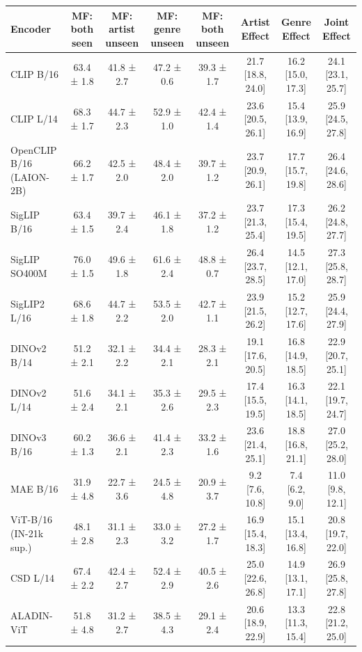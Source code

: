 \begin{tabular}{lccccccc}
\toprule
Encoder & MF: both seen & MF: artist unseen & MF: genre unseen & MF: both unseen & Artist Effect & Genre Effect & Joint Effect \\
\midrule
CLIP B/16 & 63.4 ± 1.8 & 41.8 ± 2.7 & 47.2 ± 0.6 & 39.3 ± 1.7 & 21.7 [18.8, 24.0] & 16.2 [15.0, 17.3] & 24.1 [23.1, 25.7] \\
CLIP L/14 & 68.3 ± 1.7 & 44.7 ± 2.3 & 52.9 ± 1.0 & 42.4 ± 1.4 & 23.6 [20.5, 26.1] & 15.4 [13.9, 16.9] & 25.9 [24.5, 27.8] \\
OpenCLIP B/16 (LAION-2B) & 66.2 ± 1.7 & 42.5 ± 2.0 & 48.4 ± 2.0 & 39.7 ± 1.2 & 23.7 [20.9, 26.1] & 17.7 [15.7, 19.8] & 26.4 [24.6, 28.6] \\
SigLIP B/16 & 63.4 ± 1.5 & 39.7 ± 2.4 & 46.1 ± 1.8 & 37.2 ± 1.2 & 23.7 [21.3, 25.4] & 17.3 [15.4, 19.5] & 26.2 [24.8, 27.7] \\
SigLIP SO400M & 76.0 ± 1.5 & 49.6 ± 1.8 & 61.6 ± 2.4 & 48.8 ± 0.7 & 26.4 [23.7, 28.5] & 14.5 [12.1, 17.0] & 27.3 [25.8, 28.7] \\
SigLIP2 L/16 & 68.6 ± 1.8 & 44.7 ± 2.2 & 53.5 ± 2.0 & 42.7 ± 1.1 & 23.9 [21.5, 26.2] & 15.2 [12.7, 17.6] & 25.9 [24.4, 27.9] \\
DINOv2 B/14 & 51.2 ± 2.1 & 32.1 ± 2.2 & 34.4 ± 2.1 & 28.3 ± 2.1 & 19.1 [17.6, 20.5] & 16.8 [14.9, 18.5] & 22.9 [20.7, 25.1] \\
DINOv2 L/14 & 51.6 ± 2.4 & 34.1 ± 2.1 & 35.3 ± 2.6 & 29.5 ± 2.3 & 17.4 [15.5, 19.5] & 16.3 [14.1, 18.5] & 22.1 [19.7, 24.7] \\
DINOv3 B/16 & 60.2 ± 1.3 & 36.6 ± 2.1 & 41.4 ± 2.3 & 33.2 ± 1.6 & 23.6 [21.4, 25.1] & 18.8 [16.8, 21.1] & 27.0 [25.2, 28.0] \\
MAE B/16 & 31.9 ± 4.8 & 22.7 ± 3.6 & 24.5 ± 4.8 & 20.9 ± 3.7 & 9.2 [7.6, 10.8] & 7.4 [6.2, 9.0] & 11.0 [9.8, 12.1] \\
ViT-B/16 (IN-21k sup.) & 48.1 ± 2.8 & 31.1 ± 2.3 & 33.0 ± 3.2 & 27.2 ± 1.7 & 16.9 [15.4, 18.3] & 15.1 [13.4, 16.8] & 20.8 [19.7, 22.0] \\
CSD L/14 & 67.4 ± 2.2 & 42.4 ± 2.7 & 52.4 ± 2.9 & 40.5 ± 2.6 & 25.0 [22.6, 26.8] & 14.9 [13.1, 17.1] & 26.9 [25.8, 27.8] \\
ALADIN-ViT & 51.8 ± 4.8 & 31.2 ± 2.7 & 38.5 ± 4.3 & 29.1 ± 2.4 & 20.6 [18.9, 22.9] & 13.3 [11.3, 15.4] & 22.8 [21.2, 25.0] \\
\bottomrule
\end{tabular}
